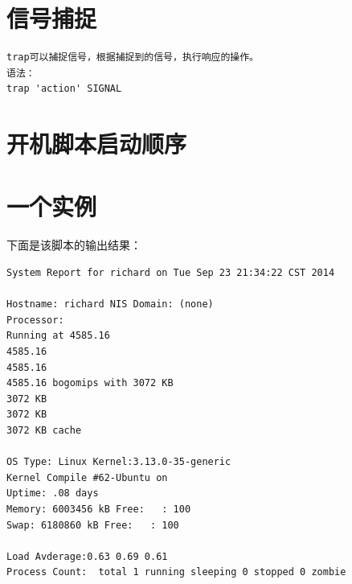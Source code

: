 \section{信号捕捉}

\begin{verbatim}
trap可以捕捉信号，根据捕捉到的信号，执行响应的操作。
语法：
trap 'action' SIGNAL
\end{verbatim}

\section{开机脚本启动顺序}

\section{一个实例}



下面是该脚本的输出结果：

\begin{lstlisting}[numbers=none,aboveskip=5pt,belowskip=5pt]
System Report for richard on Tue Sep 23 21:34:22 CST 2014

Hostname: richard NIS Domain: (none)
Processor: 
Running at 4585.16
4585.16
4585.16
4585.16 bogomips with 3072 KB
3072 KB
3072 KB
3072 KB cache

OS Type: Linux Kernel:3.13.0-35-generic
Kernel Compile #62-Ubuntu on
Uptime: .08 days
Memory: 6003456 kB Free:   : 100
Swap: 6180860 kB Free:   : 100

Load Avderage:0.63 0.69 0.61 
Process Count:  total 1 running sleeping 0 stopped 0 zombie
\end{lstlisting}
